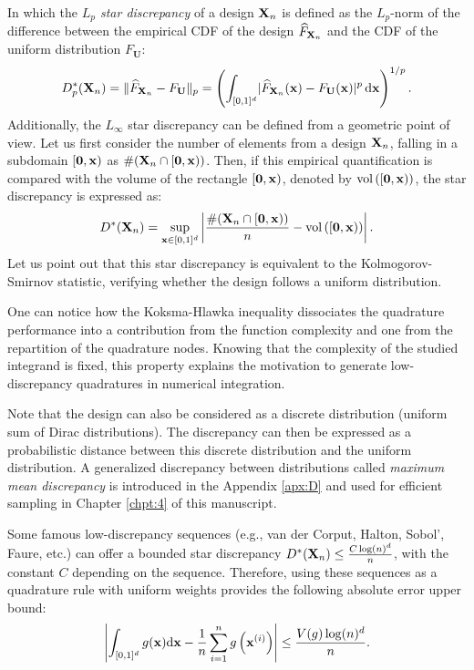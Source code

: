 In which the \textit{$L_p$ star discrepancy} of a design ${\bf X}_n$ is defined as the $L_p$-norm of the difference between the empirical CDF of the design $\widehat{F}_{{\bf X}_n}$ and the CDF of the uniform distribution $F_{\textbf{U}}$:  
\begin{equation}
    D^*_p({\bf X}_n) = \lVert \widehat{F}_{{\bf X}_n} - F_{\textbf{U}}\rVert _p = \left(\int_{[0, 1]^d} \lvert\widehat{F}_{{\bf X}_n}({\bf x}) - F_{\textbf{U}}({\bf x})\rvert ^p \, \mathrm{d}{\bf x} \right)^{1/p}.
\end{equation}
Additionally, the $L_\infty$ star discrepancy can be defined from a geometric point of view. 
Let us first consider the number of elements from a design ${\bf X}_n$, falling in a subdomain $[\mathbf{0}, {\bf x})$ as $\#({\bf X}_n \cap [\mathbf{0}, {\bf x}))$. 
Then, if this empirical quantification is compared with the volume of the rectangle $[\mathbf{0}, {\bf x})$, denoted by $\mathrm{vol}\left([\mathbf{0}, {\bf x})\right)$, the star discrepancy is expressed as:   
\begin{equation}
    D^*({\bf X}_n) = \sup_{{\bf x} \in [0, 1]^d} \left| \frac{\#({\bf X}_n \cap [\mathbf{0}, {\bf x}))}{n} - \mathrm{vol}\left([\mathbf{0}, {\bf x})\right)\right|.
\end{equation}
Let us point out that this star discrepancy is equivalent to the Kolmogorov-Smirnov statistic, verifying whether the design follows a uniform distribution. 

One can notice how the Koksma-Hlawka inequality dissociates the quadrature performance into a contribution from the function complexity and one from the repartition of the quadrature nodes. 
Knowing that the complexity of the studied integrand is fixed, this property explains the motivation to generate low-discrepancy quadratures in numerical integration.  

Note that the design can also be considered as a discrete distribution (uniform sum of Dirac distributions).
The discrepancy can then be expressed as a probabilistic distance between this discrete distribution and the uniform distribution. 
A generalized discrepancy between distributions called \textit{maximum mean discrepancy} is introduced in the Appendix \ref{apx:D} and used for efficient sampling in Chapter \ref{chpt:4} of this manuscript.

Some famous low-discrepancy sequences (e.g., van der Corput, Halton, Sobol', Faure, etc.) can offer a bounded star discrepancy $D^*({\bf X}_n) \leq \frac{C \log(n)^d}{n}$, with the constant $C$ depending on the sequence.
Therefore, using these sequences as a quadrature rule with uniform weights provides the following absolute error upper bound: 
\begin{equation}
    \left| \int_{[0, 1]^d} g({\bf x}) \mathrm{d}{\bf x} - \frac1n \sum_{i=1}^n g\left({\bf x}^{(i)}\right)\right| \leq  \frac{V(g) \log(n)^d}{n}.
\end{equation}

